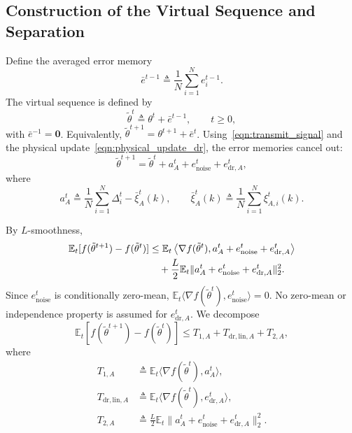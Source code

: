 \documentclass[journal]{IEEEtran}
\begin{document}
\subsection{Construction of the Virtual Sequence and Separation}

Define the averaged error memory
\begin{equation}
    \bar e^{t-1}\triangleq \frac1N\sum_{i=1}^{N}e_i^{t-1}.
\end{equation}
The virtual sequence is defined by
\begin{equation}
    \tilde\theta^t\triangleq \theta^t+\bar e^{t-1},
    \qquad t\ge0,
\end{equation}
with $\bar e^{-1}=\mathbf{0}$. Equivalently, $\tilde\theta^{t+1}=\theta^{t+1}+\bar e^t$. Using~\eqref{eqn:transmit_signal} and the physical update~\eqref{eqn:physical_update_dr}, the error memories cancel out:
\begin{equation}
    \tilde\theta^{t+1}
    =\tilde\theta^t+a_A^t+e_{\mathrm{noise}}^t+e_{\mathrm{dr},A}^t,
\end{equation}
where
\begin{equation}
    a_A^t
    \triangleq
    \frac1N\sum_{i=1}^{N}\Delta_i^t-\bar\xi_A^t(k),
    \qquad
    \bar\xi_A^t(k)\triangleq\frac1N\sum_{i=1}^{N}\xi_{A,i}^t(k).
\end{equation}

By $L$-smoothness,
\begin{align}
    \label{eqn:descent_expansion}
    \mathbb{E}_t[f(\tilde\theta^{t+1})-f(\tilde\theta^t)]
    &\le
    \mathbb{E}_t\left\langle\nabla f(\tilde\theta^t),
    a_A^t+e_{\mathrm{noise}}^t+e_{\mathrm{dr},A}^t\right\rangle
    \notag\\
    &\quad+
    \frac{L}{2}\mathbb{E}_t\|a_A^t+e_{\mathrm{noise}}^t+e_{\mathrm{dr},A}^t\|_2^2.
\end{align}
Since $e_{\mathrm{noise}}^t$ is conditionally zero-mean, $\mathbb{E}_t\langle\nabla f(\tilde\theta^t),e_{\mathrm{noise}}^t\rangle=0$. No zero-mean or independence property is assumed for $e_{\mathrm{dr},A}^t$. We decompose
\begin{equation}
    \mathbb{E}_t[f(\tilde\theta^{t+1})-f(\tilde\theta^t)]
    \le T_{1,A}+T_{\mathrm{dr,lin},A}+T_{2,A},
\end{equation}
where
\begin{align}
    T_{1,A}&\triangleq\mathbb{E}_t\langle\nabla f(\tilde\theta^t),a_A^t\rangle,\\
    T_{\mathrm{dr,lin},A}&\triangleq\mathbb{E}_t\langle\nabla f(\tilde\theta^t),e_{\mathrm{dr},A}^t\rangle,\\
    T_{2,A}&\triangleq\frac{L}{2}\mathbb{E}_t\|a_A^t+e_{\mathrm{noise}}^t+e_{\mathrm{dr},A}^t\|_2^2.
\end{align}
\end{document}

